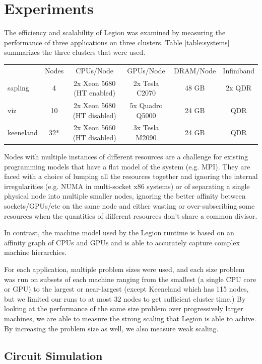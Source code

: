 \section{Experiments}
\label{sec:exp}

The efficiency and scalability of Legion was examined by measuring the performance
of three applications on three clusters.  Table \ref{table:systems} summarizes 
the three clusters that were used.

\begin{tabular}{lccccc}
 & Nodes & CPUs/Node & GPUs/Node & DRAM/Node & Infiniband \\
sapling & 4 & 2x Xeon 5680 (HT enabled) & 2x Tesla C2070 & 48 GB & 2x QDR \\
viz & 10 & 2x Xeon 5680 (HT disabled) & 5x Quadro Q5000 & 24 GB & QDR \\
keeneland & 32* & 2x Xeon 5660 (HT disabled) & 3x Tesla M2090 & 24 GB & QDR 
\end{tabular}

Nodes with multiple instances of different resources are a challenge for 
existing programming models that have a flat model of the system (e.g. MPI).
They are faced with a choice of lumping all 
the resources together and ignoring the internal irregularities (e.g. NUMA
in multi-socket x86 systems) or of separating a single physical node into
multiple smaller nodes, ignoring the better affinity between sockets/GPUs/etc
on the same node and either wasting or over-subscribing some resources when
the quantities of different resources don't share a common divisor.

In contrast, the machine model used by the Legion runtime is based on an
affinity graph of CPUs and GPUs and is able to accurately capture complex
machine hierarchies.

For each application, multiple problem sizes were used, and each size problem was
run on subsets of each machine ranging from the smallest (a single CPU core or GPU)
to the largest or near-largest (except Keeneland which has 115 nodes, but we limited 
our runs to at most 32 nodes to get sufficient cluster time.)
By looking at the performance of the same size problem over progressively larger
machines, we are able to measure the strong scaling that Legion is able to
achive.  By increasing the problem size as well, we also measure weak scaling.

\subsection{Circuit Simulation}
\label{subsec:exp_ckt}

